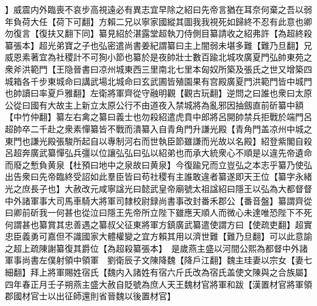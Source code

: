】威震内外臨喪不哀步高視遠必有異志宜早除之紹曰先帝言猶在耳奈何棄之吾以弱年負荷大任【荷下可翻】方賴二兄以寧家國縱其圖我我視死如歸終不忍有此意也卿勿復言【復扶又翻下同】纂見紹於湛露堂超執刀侍側目纂請收之紹弗許【為超終殺纂張本】超光弟寶之子也弘密遣尚書姜紀謂纂曰主上闇弱未堪多難【難乃旦翻】兄威恩素著宜為社稷計不可狥小節也纂於是夜帥壯士數百踰北城攻廣夏門弘帥東苑之衆斧洪範門【王隐晉書曰凉州城東西三里南北七里本匈奴所築及張氏之世又增築四城箱各千步東城命曰講武場北城命曰玄武圃皆殖園果有宫殿廣夏門洪範門皆中城門也帥讀曰率夏戶雅翻】左衛將軍齊從守融明觀【觀古玩翻】逆問之曰誰也衆曰太原公從曰國有大故主上新立太原公行不由道夜入禁城將為亂邪因抽劔直前斫纂中額【中竹仲翻】纂左右禽之纂曰義士也勿殺紹遣虎賁中郎將呂開帥禁兵拒戰於端門呂超帥卒二千赴之衆素憚纂皆不戰而潰纂入自青角門升謙光殿【青角門盖凉州中城之東門也謙光殿張駿所起自以專制河右而世執臣節雖謙而光故以名殿】紹登紫閣自殺呂超奔廣武纂憚弘兵彊以位讓弘弘曰弘以紹弟也而承大統衆心不順是以違先帝遺命而廢之慙負黄泉【杜預曰地中之泉故曰黄泉】今復踰兄而立豈弘之本志乎纂乃使弘出告衆曰先帝臨終受詔如此羣臣皆曰苟社稷有主誰敢違者纂遂即天王位【纂字永緒光之庶長子也】大赦改元咸寧諡光曰懿武皇帝廟號太祖諡紹曰隱王以弘為大都督督中外諸軍事大司馬車騎大將軍司隸校尉録尚書事改封番禾郡公【番音盤】纂謂齊從曰卿前斫我一何甚也從泣曰隱王先帝所立陛下雖應天順人而微心未達唯恐陛下不死何謂甚也纂賞其忠善遇之纂叔父征東將軍方鎮廣武纂遣使謂方曰【使疏吏翻】超實忠臣義勇可嘉但不識國家大體權變之宜方賴其用以濟世難【難乃旦翻】可以此意諭之超上疏陳謝纂復其爵位【為超殺纂張本】　是歲燕主盛以河間公熙為都督中外諸軍事尚書左僕射領中領軍　劉衛辰子文陳降魏【降戶江翻】魏主珪妻以宗女【妻七細翻】拜上將軍賜姓宿氏【魏内入諸姓有宿六斤氏改為宿氏盖使文陳與之合族屬】四年春正月壬子朔燕主盛大赦自貶號為庶人天王魏材官將軍和跋【漢置材官將軍領郡國材官士以出征師還則省晉魏以後置材官】

